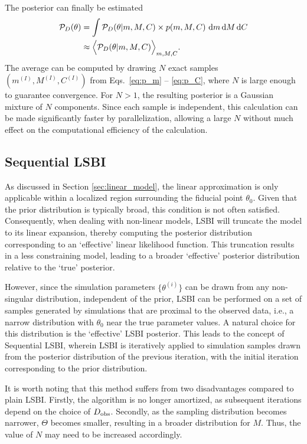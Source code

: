\documentclass[%
 reprint,
 amsmath,amssymb,
 aps,
]{revtex4-2}
\begin{document}
The posterior can finally be estimated
\begin{align}\label{eq:posterior_est}
	\mathcal{P}_D(\theta) &= \int \mathcal{P}_D(\theta|m,M,C)\times p(m,M,C) \ \mathrm{d} m\, \mathrm{d} M\, \mathrm{d} C \notag\\
	&\approx \Big\langle \mathcal{P}_D(\theta|m,M,C)\Big\rangle_{m,M,C}.
\end{align}
The average can be computed by drawing $N$ exact samples $(m^{(I)},M^{(I)},C^{(I)})$ from Eqs.~\ref{eq:p_m} -- \ref{eq:p_C}, where $N$ is large enough to guarantee convergence. For $N>1$, the resulting posterior is a Gaussian mixture of $N$ components. Since each sample is independent, this calculation can be made significantly faster by parallelization, allowing a large $N$ without much effect on the computational efficiency of the calculation.

\subsection{Sequential LSBI}\label{sec:seqLSBI}

As discussed in Section \ref{sec:linear_model}, the linear approximation is only applicable within a localized region surrounding the fiducial point $\theta_0$. Given that the prior distribution is typically broad, this condition is not often satisfied. Consequently, when dealing with non-linear models, LSBI will truncate the model to its linear expansion, thereby computing the posterior distribution corresponding to an ‘effective’ linear likelihood function. This truncation results in a less constraining model, leading to a broader ‘effective’ posterior distribution relative to the ‘true’ posterior.

However, since the simulation parameters $\{\theta^{(i)}\}$ can be drawn from any non-singular distribution, independent of the prior, LSBI can be performed on a set of samples generated by simulations that are proximal to the observed data, i.e., a narrow distribution with $\theta_0$ near the true parameter values. A natural choice for this distribution is the `effective' LSBI posterior. This leads to the concept of Sequential LSBI, wherein LSBI is iteratively applied to simulation samples drawn from the posterior distribution of the previous iteration, with the initial iteration corresponding to the prior distribution.

It is worth noting that this method suffers from two disadvantages compared to plain LSBI. Firstly, the algorithm is no longer amortized, as subsequent iterations depend on the choice of $D_\text{obs}$. Secondly, as the sampling distribution becomes narrower, $\Theta$ becomes smaller, resulting in a broader distribution for $M$. Thus, the value of $N$ may need to be increased accordingly.
\end{document}
